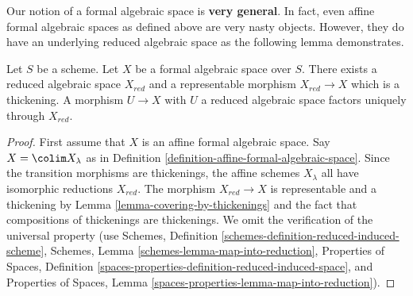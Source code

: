 \medskip\noindent
Our notion of a formal algebraic space is {\bf very general}.
In fact, even affine formal algebraic spaces as defined above
are very nasty objects. However, they do have an underlying
reduced algebraic space as the following lemma demonstrates.

\begin{lemma}
\label{lemma-reduction-formal-algebraic-space}
Let $S$ be a scheme. Let $X$ be a formal algebraic space over $S$.
There exists a reduced algebraic space $X_{red}$ and a representable
morphism $X_{red} \to X$ which is a thickening. A morphism $U \to X$
with $U$ a reduced algebraic space factors uniquely through $X_{red}$.
\end{lemma}

\begin{proof}
First assume that $X$ is an affine formal algebraic space.
Say $X = \colim X_\lambda$ as in
Definition \ref{definition-affine-formal-algebraic-space}.
Since the transition morphisms are thickenings, the affine
schemes $X_\lambda$ all have isomorphic reductions $X_{red}$.
The morphism $X_{red} \to X$ is representable and a thickening
by Lemma \ref{lemma-covering-by-thickenings} and the fact that
compositions of thickenings are thickenings. We omit the
verification of the universal
property (use Schemes, Definition
\ref{schemes-definition-reduced-induced-scheme},
Schemes, Lemma \ref{schemes-lemma-map-into-reduction},
Properties of Spaces, Definition
\ref{spaces-properties-definition-reduced-induced-space}, and
Properties of Spaces, Lemma \ref{spaces-properties-lemma-map-into-reduction}).


\end{proof}
